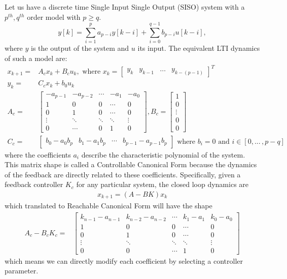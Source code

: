 \documentclass[sigconf]{llncs}
\newcommand{\mat}[1]{{#1}}
\renewcommand{\vec}[1]{{#1}}
\begin{document}
Let us have a discrete time Single Input Single Output (SISO) system with a $p^{th},q^{th}$ order model with $p\geq q$.
$$y[k]=\sum_{i=1}^p a_{p-i}y[k-i]+\sum_{i=0}^{q-1} b_{p-i}u[k-i],$$
where $y$ is the output of the system and $u$ its input.
The equivalent LTI dynamics of such a model are:
\begin{align}
\label{eq:cf_SISO}
\vec{x}_{k+1}=&\mat{A}_c\vec{x}_k+\mat{B}_cu_k, \text{ where } \vec{x}_k=[\begin{array}{cccc}y_k&y_{k-1}&\hdots&y_{k-(p-1)}\end{array}]^T\\
y_k=&\mat{C}_c\vec{x}_k + b_0u_k\nonumber\\
\mat{A}_c=&\left[
\begin{array}{ccccc}
-a_{p-1}&-a_{p-2}&\cdots&-a_1&-a_0\\
1&0&0&\cdots&0\\
0&1&0&\cdots&0\\
\vdots&\ddots&\ddots&\ddots&\vdots\\
0&\cdots&0&1&0
\end{array}\right],
\mat{B}_c=\left[
\begin{array}{c}
1\\0\\ \vdots\\ 0\\ 0
\end{array}\right]\nonumber\\
\mat{C}_c=&[\begin{array}{ccccc}b_0-a_0b_p&b_1-a_1b_p&\cdots&b_{p-1}-a_{p-1}b_p\end{array}] \text{ where } b_i=0 \text{ and } i \in [0, ...\,,p-q]\nonumber
\end{align}
%
where the coefficients $a_i$ describe the characteristic polynomial of the
system.  This matrix shape is called a Controllable Canonical Form because
the dynamics of the feedback are directly related to these coefficients. 
Specifically, given a feedback controller $\mat{K}_c$ for any particular
system, the closed loop dynamics are
%
\begin{align}
\vec{x}_{k+1}=(\mat{A}-\mat{B}\mat{K})\vec{x}_k
\label{eq:closeloopdynamics}
\end{align}
which translated to Reachable Canonical Form will have the shape
\begin{align}
\mat{A}_c-\mat{B}_c\mat{K}_c=&\left[
\begin{array}{ccccc}
k_{n-1}-a_{n-1}&k_{n-2}-a_{n-2}&\cdots&k_1-a_1&k_0-a_0\\
1&0&0&\cdots&0\\
0&1&0&\cdots&0\\
\vdots&\ddots&\ddots&\ddots&\vdots\\
0&0&\cdots&1&0
\end{array}\right]
\label{eq:cf_SISO_fb}
\end{align}
%
which means we can directly modify each coefficient by selecting a
controller parameter.
\end{document}
